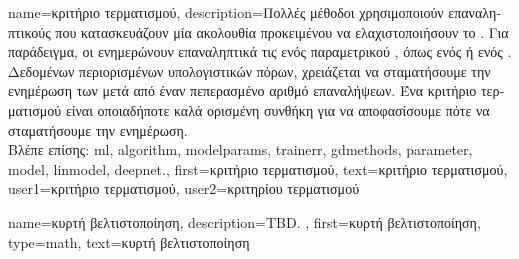 {name={\foreignlanguage{greek}{κριτήριο τερματισμού}},
	description={\foreignlanguage{greek}{Πολλές μέθοδοι} 
		 \foreignlanguage{greek}{χρησιμοποι\-ούν επαναληπτικούς}  
		\foreignlanguage{greek}{που κατασκευάζουν μία ακολουθία}  
		\foreignlanguage{greek}{προκειμένου να ελαχιστοποιήσουν το} . 
		\foreignlanguage{greek}{Για παράδειγμα, οι}  \foreignlanguage{greek}{ενημερώνουν 
		επαναληπτικά τις}  \foreignlanguage{greek}{ενός παραμετρικού} , 
		\foreignlanguage{greek}{όπως ενός}  \foreignlanguage{greek}{ή ενός} . 
		\foreignlanguage{greek}{Δεδομένων περιορισμένων υπολογιστικών πόρων, χρειάζεται να σταματήσουμε
		την ενημέρωση των}  \foreignlanguage{greek}{μετά από έναν
		πεπερασμένο αριθμό επαναλήψεων. Ένα κριτήριο τερματισμού είναι οποιαδήποτε καλά ορισμένη συνθήκη
		για να αποφασίσουμε πότε να σταματήσουμε την ενημέρωση.}  \\
		\foreignlanguage{greek}{Βλέπε επίσης:} \gls{ml}, \gls{algorithm}, \gls{modelparams}, \gls{trainerr}, \gls{gdmethods}, 
		\gls{parameter}, \gls{model}, \gls{linmodel}, \gls{deepnet}.},
	first={\foreignlanguage{greek}{κριτήριο τερματισμού}},
	text={\foreignlanguage{greek}{κριτήριο τερματισμού}},
	user1={\foreignlanguage{greek}{κριτήριο τερματισμού}}, %
	user2={\foreignlanguage{greek}{κριτηρίου τερματισμού}} %
}

{name={\foreignlanguage{greek}{κυρτή βελτιστοποίηση}},
 	description={TBD. 
  },
	first={\foreignlanguage{greek}{κυρτή βελτιστοποίηση}},
	type=math,
  	text={\foreignlanguage{greek}{κυρτή βελτιστοποίηση}}
}

